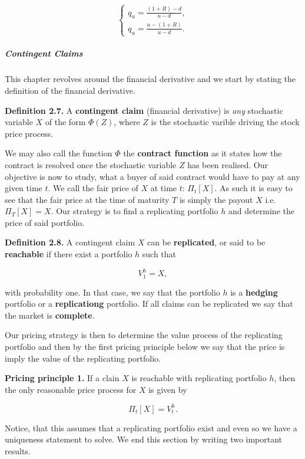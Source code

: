 \documentclass[
]{article}
\begin{document}
\[\left\{\begin{matrix}q_u=\frac{(1+R)-d}{u-d},\\ q_u=\frac{u-(1+R)}{u-d}.\end{matrix}\right.\]

\hypertarget{contingent-claims}{%
\subparagraph{Contingent Claims}\label{contingent-claims}}

This chapter revolves around the financial derivative and we start by
stating the definition of the financial derivative.

\textbf{Definition 2.7.} A \textbf{contingent claim} (financial
derivative) is \emph{any} stochastic variable \(X\) of the form
\(\Phi(Z)\), where \(Z\) is the stochastic varible driving the stock
price process.

We may also call the function \(\Phi\) the \textbf{contract function} as
it states how the contract is resolved once the stochastic variable
\(Z\) has been realised. Our objective is now to study, what a buyer of
said contract would have to pay at any given time \(t\). We call the
fair price of \(X\) at time \(t\): \(\Pi_t[X]\). As such it is easy to
see that the fair price at the time of maturity \(T\) is simply the
payout \(X\) i.e.~\(\Pi_T[X]=X\). Our strategy is to find a replicating
portfolio \(h\) and determine the price of said portfolio.

\textbf{Definition 2.8.} A contingent claim \(X\) can be
\textbf{replicated}, or said to be \textbf{reachable} if there exist a
portfolio \(h\) such that

\[
V_1^h=X,
\]

with probability one. In that case, we say that the portfolio \(h\) is a
\textbf{hedging} portfolio or a \textbf{replicationg} portfolio. If all
claims can be replicated we say that the market is \textbf{complete}.

Our pricing strategy is then to determine the value process of the
replicating portfolio and then by the first pricing principle below we
say that the price is imply the value of the replicating portfolio.

\textbf{Pricing principle 1.} If a clain \(X\) is reachable with
replicating portfolio \(h\), then the only reasonable price process for
\(X\) is given by

\[
\Pi_t[X]=V_t^h.
\]

Notice, that this assumes that a replicating portfolio exist and even so
we have a uniqueness statement to solve. We end this section by writing
two important results.
\end{document}
